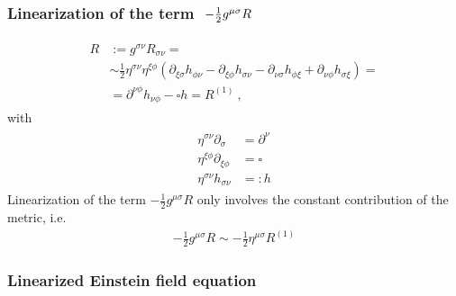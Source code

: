 \documentclass[letterpaper,10pt,english]{jupyterBook}
\begin{document}
\subsubsection*{Linearization of the term \protect\(\ -\frac{1}{2} g^{\mu \sigma} R\protect\)}
\begin{equation*}
\begin{split}\begin{aligned}
  R 
  & := g^{\sigma \nu} R_{\sigma \nu} = \\
  & \sim \frac{1}{2} \eta^{\sigma \nu} \eta^{\xi \phi} \left( \partial_{\xi \sigma} h_{\phi \nu} - \partial_{\xi \phi} h_{\sigma \nu} - \partial_{\nu \sigma} h_{\phi \xi} + \partial_{\nu \phi} h_{\sigma \xi} \right) = \\
  & = \partial^{\nu \phi} h_{\nu \phi} - \square h = R^{(1)} \ ,
\end{aligned}\end{split}
\end{equation*}
\sphinxAtStartPar
with
\begin{equation*}
\begin{split}\begin{aligned}
 \eta^{\sigma \nu} \partial_{\sigma} & = \partial^{\nu} \\
 \eta^{\xi \phi} \partial_{\xi \phi} & = \square \\
 \eta^{\sigma \nu} h_{\sigma \nu} & =: h
\end{aligned}\end{split}
\end{equation*}
\sphinxAtStartPar
Linearization of the term \(-\frac{1}{2} g^{\mu \sigma} R\) only involves the constant contribution of the metric, i.e.
\begin{equation}\label{equation:ch/relativity-general/linearized-efe:eq:linearize-efe:gR}
\begin{split}- \frac{1}{2} g^{\mu \sigma} R \sim - \frac{1}{2} \eta^{\mu \sigma} R^{(1)}\end{split}
\end{equation}\subsubsection*{Linearized Einstein field equation}
\end{document}
